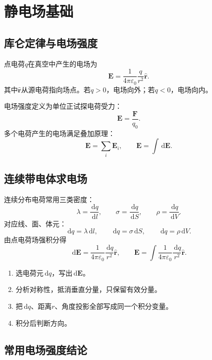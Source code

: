 \documentclass[UTF8,zihao=-4]{ctexart}
\newcommand{\dd}{\,\mathrm d}
\newcommand{\epsz}{\varepsilon_0}
\newcommand{\ve}[1]{\bm{#1}}
\newcommand{\E}{\ve E}
\begin{document}
\section{静电场基础}

\subsection{库仑定律与电场强度}

点电荷\(q\)在真空中产生的电场为
\begin{equation}
\E=\frac{1}{4\pi\epsz}\frac{q}{r^2}\hat{\ve r}.
\end{equation}
其中\(\hat{\ve r}\)从源电荷指向场点。若\(q>0\)，电场向外；若\(q<0\)，电场向内。

电场强度定义为单位正试探电荷受力：
\begin{equation}
\E=\frac{\ve F}{q_0}.
\end{equation}
多个电荷产生的电场满足叠加原理：
\begin{equation}
\E=\sum_i \E_i,\qquad \E=\int \dd\E.
\end{equation}

\subsection{连续带电体求电场}

连续分布电荷常用三类密度：
\[
\lambda=\frac{\dd q}{\dd l},\qquad
\sigma=\frac{\dd q}{\dd S},\qquad
\rho=\frac{\dd q}{\dd V}.
\]
对应线、面、体元：
\[
\dd q=\lambda\dd l,\qquad \dd q=\sigma\dd S,\qquad \dd q=\rho\dd V.
\]
由点电荷场强积分得
\begin{equation}
\dd\E=\frac{1}{4\pi\epsz}\frac{\dd q}{r^2}\hat{\ve r},\qquad
\E=\int \frac{1}{4\pi\epsz}\frac{\dd q}{r^2}\hat{\ve r}.
\end{equation}

\begin{methodbox}[连续带电体积分法套路]
\begin{enumerate}
  \item 选电荷元\(\dd q\)，写出\(\dd\E\)。
  \item 分析对称性，抵消垂直分量，只保留有效分量。
  \item 把\(\dd q\)、距离\(r\)、角度投影全部写成同一个积分变量。
  \item 积分后判断方向。
\end{enumerate}
\end{methodbox}

\subsection{常用电场强度结论}
\end{document}
